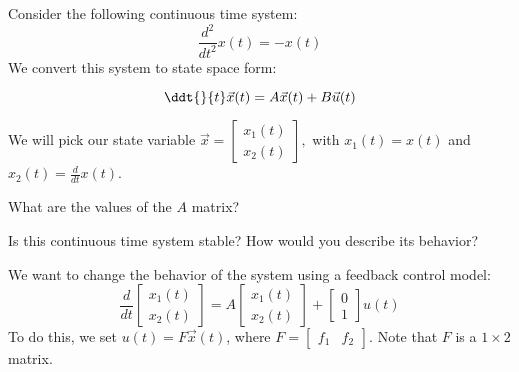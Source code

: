 

Consider the following continuous time system:
$$
\frac{d^2}{dt^2} x(t) = -x(t)
$$
We convert this system to state space form:

\begin{equation}
  \ddt{}{t} \vec{x}(t) = A \vec{x}(t) + B \vec{u}(t)
\end{equation}

We will pick our state variable $\vec{x} = \begin{bmatrix} x_1(t) \\ x_2(t) \end{bmatrix},$
with $x_1(t) = x(t)$ and $x_2(t) = \frac{d}{dt} x(t)$.

\begin{enumerate}

\qitem What are the values of the $A$ matrix?

\ws{
\vspace{30px}
}




\qitem Is this continuous time system stable? How would you describe its behavior?

\ws{
\vspace{50px}
}


\end{enumerate}

We want to change the behavior of the system using a feedback control model:
$$
\frac{d}{dt}
\begin{bmatrix}
x_1(t) \\
x_2(t)
\end{bmatrix}
=
A
\begin{bmatrix}
x_1(t) \\
x_2(t)
\end{bmatrix}
+
\begin{bmatrix}
0 \\
1
\end{bmatrix}
u(t)
$$
To do this, we set $u(t) = F\vec{x}(t)$, where $F = \begin{bmatrix} f_1 & f_2 \end{bmatrix}$. Note that $F$ is a $1 \times 2$ matrix.

